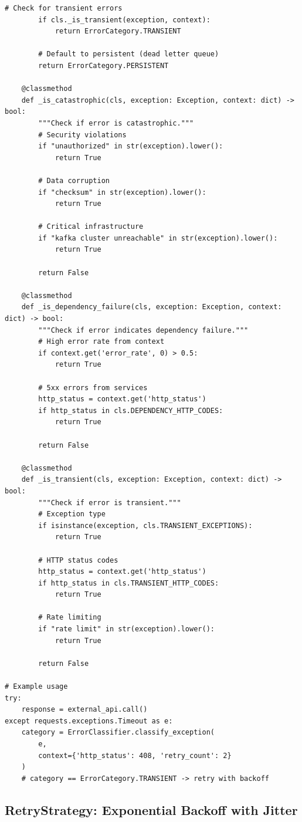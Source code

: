 \begin{lstlisting}[style=python, caption={Error Classification Logic}]
        # Check for transient errors
        if cls._is_transient(exception, context):
            return ErrorCategory.TRANSIENT

        # Default to persistent (dead letter queue)
        return ErrorCategory.PERSISTENT

    @classmethod
    def _is_catastrophic(cls, exception: Exception, context: dict) -> bool:
        """Check if error is catastrophic."""
        # Security violations
        if "unauthorized" in str(exception).lower():
            return True

        # Data corruption
        if "checksum" in str(exception).lower():
            return True

        # Critical infrastructure
        if "kafka cluster unreachable" in str(exception).lower():
            return True

        return False

    @classmethod
    def _is_dependency_failure(cls, exception: Exception, context: dict) -> bool:
        """Check if error indicates dependency failure."""
        # High error rate from context
        if context.get('error_rate', 0) > 0.5:
            return True

        # 5xx errors from services
        http_status = context.get('http_status')
        if http_status in cls.DEPENDENCY_HTTP_CODES:
            return True

        return False

    @classmethod
    def _is_transient(cls, exception: Exception, context: dict) -> bool:
        """Check if error is transient."""
        # Exception type
        if isinstance(exception, cls.TRANSIENT_EXCEPTIONS):
            return True

        # HTTP status codes
        http_status = context.get('http_status')
        if http_status in cls.TRANSIENT_HTTP_CODES:
            return True

        # Rate limiting
        if "rate limit" in str(exception).lower():
            return True

        return False

# Example usage
try:
    response = external_api.call()
except requests.exceptions.Timeout as e:
    category = ErrorClassifier.classify_exception(
        e,
        context={'http_status': 408, 'retry_count': 2}
    )
    # category == ErrorCategory.TRANSIENT -> retry with backoff
\end{lstlisting}

\subsection{RetryStrategy: Exponential Backoff with Jitter}

